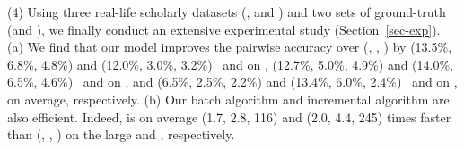 \sstab(4) Using three real-life scholarly datasets (\aan, \aminer and \magdata) and two sets of ground-truth (\recom and \fcita), we finally conduct an extensive experimental study (Section~\ref{sec-exp}).
(a) We find that our model \ensemblerank improves the pairwise accuracy \cite{Richardson06:BPR} over (\pagerank \cite{Brin98:PageRank}, \futurerank \cite{sayyadi09}, \hhgrank \cite{Liang16AAAI}) by
(13.5\%, 6.8\%, 4.8\%) and (12.0\%, 3.0\%, 3.2\%) \wrt\ \recom and \fcita  on \aan,
(12.7\%, 5.0\%, 4.9\%) and (14.0\%, 6.5\%, 4.6\%) \wrt\ \recom and \fcita on \aminer, and
(6.5\%, 2.5\%, 2.2\%) and (13.4\%, 6.0\%, 2.4\%) \wrt\ \recom and \fcita on \magdata, on average, respectively.
%
(b) Our batch algorithm \batensemble and incremental algorithm \incensemble are also efficient. Indeed, \incensemble is on average (1.7, 2.8, 116) and (2.0, 4.4, 245) times faster than (\batensemble, \futurerank, \hhgrank)  on the large \aminer and \magdata, respectively.



